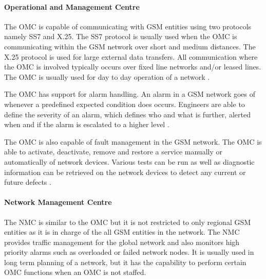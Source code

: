 \paragraph{Operational and Management Centre}
The OMC is capable of communicating with GSM entities using two protocols namely SS7 and X.25. The SS7 protocol is usually used when the OMC is communicating within the GSM network over short and medium distances. The X.25 protocol is used for large external data transfers. All communication where the OMC is involved typically occurs over fixed line networks and/or leased lines. The OMC is usually used for day to day operation of a network \cite{GSMSysEngin}.

The OMC has support for alarm handling. An alarm in a GSM network goes of whenever a predefined expected condition does occurs. Engineers are able to define the severity of an alarm, which defines who and what is further, alerted when and if the alarm is escalated to a higher level \cite{GSMSysEngin}.

The OMC is also capable of fault management in the GSM network. The OMC is able to activate, deactivate, remove and restore a service manually or automatically of network devices\cite{GSM92}. Various tests can be run as well as diagnostic information can be retrieved on the network devices to detect any current or future defects \cite{GSMSysEngin}.

\paragraph{Network Management Centre}
The NMC is similar to the OMC but it is not restricted to only regional GSM entities as it is in charge of the all GSM entities in the network. The NMC provides traffic management for the global network and also monitors high priority alarms such as overloaded or failed network nodes. It is usually used in long term planning of a network, but it has the capability to perform certain OMC functions when an OMC is not staffed. 

